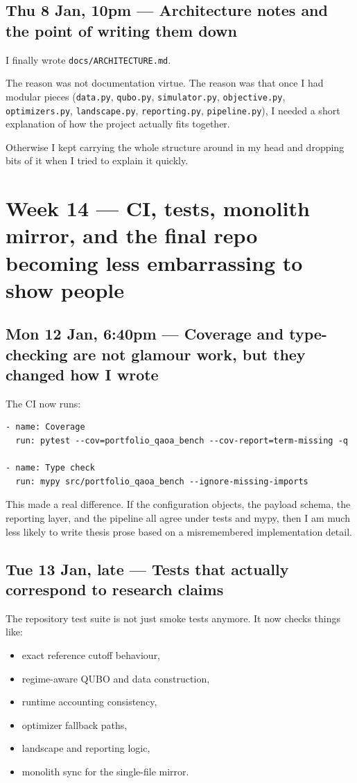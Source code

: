 \documentclass[11pt]{article}
\newcommand{\entry}[2]{\subsection*{#1 --- #2}}
\newcommand{\repo}[1]{\texttt{#1}}
\begin{document}
\entry{Thu 8 Jan, 10pm}{Architecture notes and the point of writing them down}

I finally wrote \repo{docs/ARCHITECTURE.md}.

The reason was not documentation virtue.
The reason was that once I had modular pieces
(\repo{data.py}, \repo{qubo.py}, \repo{simulator.py}, \repo{objective.py},
\repo{optimizers.py}, \repo{landscape.py}, \repo{reporting.py}, \repo{pipeline.py}),
I needed a short explanation of how the project actually fits together.

Otherwise I kept carrying the whole structure around in my head and dropping bits of it when I
tried to explain it quickly.

\section*{Week 14 --- CI, tests, monolith mirror, and the final repo becoming less embarrassing to show people}

\entry{Mon 12 Jan, 6:40pm}{Coverage and type-checking are not glamour work, but they changed how I wrote}

The CI now runs:

\begin{lstlisting}
- name: Coverage
  run: pytest --cov=portfolio_qaoa_bench --cov-report=term-missing -q

- name: Type check
  run: mypy src/portfolio_qaoa_bench --ignore-missing-imports
\end{lstlisting}

This made a real difference.
If the configuration objects, the payload schema, the reporting layer, and the pipeline all agree
under tests and mypy, then I am much less likely to write thesis prose based on a misremembered
implementation detail.

\entry{Tue 13 Jan, late}{Tests that actually correspond to research claims}

The repository test suite is not just smoke tests anymore. It now checks things like:
\begin{itemize}[leftmargin=1.4em]
\item exact reference cutoff behaviour,
\item regime-aware QUBO and data construction,
\item runtime accounting consistency,
\item optimizer fallback paths,
\item landscape and reporting logic,
\item monolith sync for the single-file mirror.
\end{itemize}
\end{document}
